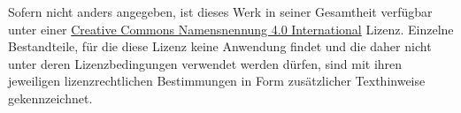 \documentclass[paper=a4,11pt,twoside,parskip=half-]{scrreprt} %
\begin{document}
\begin{small}
  Sofern nicht anders angegeben, ist dieses Werk in seiner Gesamtheit verfügbar unter einer \href{https://creativecommons.org/licenses/by/4.0/}{\foreignlanguage{english}{Creative Commons} Namensnennung 4.0 International} Lizenz. %
  Einzelne Bestandteile, für die diese Lizenz keine Anwendung findet und die daher nicht unter deren Lizenzbedingungen verwendet werden dürfen, sind mit ihren jeweiligen lizenzrechtlichen Bestimmungen in Form zusätzlicher Texthinweise gekennzeichnet. 
  \par
\end{small}

\end{document}
